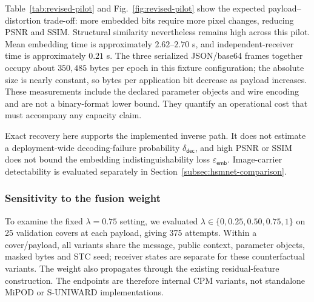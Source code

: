 \documentclass[pdflatex,sn-mathphys-num]{sn-jnl}%
\theoremstyle{definition}
\theoremstyle{game}
\theoremstyle{thmstyleone}%
\theoremstyle{thmstyletwo}%
\theoremstyle{thmstylethree}%
\begin{document}
Table~\ref{tab:revised-pilot} and Fig.~\ref{fig:revised-pilot} show the
expected payload--distortion trade-off: more embedded bits require more
pixel changes, reducing PSNR and SSIM. Structural similarity nevertheless
remains high across this pilot. Mean embedding time is approximately
$2.62$--$2.70$ s, and independent-receiver time is approximately
$0.21$ s. The three serialized JSON/base64 frames together occupy about
$350{,}485$ bytes per epoch in this fixture configuration; the absolute
size is nearly constant, so bytes per application bit decrease as payload
increases. These measurements include the declared parameter objects and
wire encoding and are not a binary-format lower bound. They quantify an
operational cost that must accompany any capacity claim.

Exact recovery here supports the implemented inverse path. It does not
estimate a deployment-wide decoding-failure probability
$\delta_{\mathsf{dec}}$, and high PSNR or SSIM does not bound the
embedding indistinguishability loss $\varepsilon_{\mathsf{emb}}$.
Image-carrier detectability is evaluated separately in
Section~\ref{subsec:hsmnet-comparison}.

\subsubsection{Sensitivity to the fusion weight}
\label{subsec:fusion-sensitivity}
To examine the fixed $\lambda=0.75$ setting, we evaluated
$\lambda\in\{0,0.25,0.50,0.75,1\}$ on 25 validation covers at each
payload, giving 375 attempts. Within a cover/payload, all variants share
the message, public context, parameter objects, masked bytes and STC seed;
receiver states are separate for these counterfactual variants. The
weight also propagates through the existing residual-feature construction.
The endpoints are therefore internal CPM variants, not standalone
MiPOD or S-UNIWARD implementations.
\end{document}
